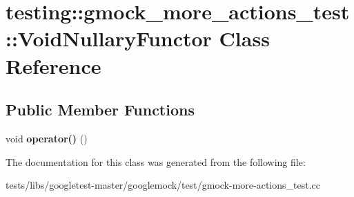 \hypertarget{classtesting_1_1gmock__more__actions__test_1_1VoidNullaryFunctor}{}\section{testing\+:\+:gmock\+\_\+more\+\_\+actions\+\_\+test\+:\+:Void\+Nullary\+Functor Class Reference}
\label{classtesting_1_1gmock__more__actions__test_1_1VoidNullaryFunctor}
\subsection*{Public Member Functions}
\begin{DoxyCompactItemize}
\item 
\mbox{\label{classtesting_1_1gmock__more__actions__test_1_1VoidNullaryFunctor_a3b71273472780abc47927c57af209204}} 
void {\bfseries operator()} ()
\end{DoxyCompactItemize}


The documentation for this class was generated from the following file\+:\begin{DoxyCompactItemize}
\item 
tests/libs/googletest-\/master/googlemock/test/gmock-\/more-\/actions\+\_\+test.\+cc\end{DoxyCompactItemize}

